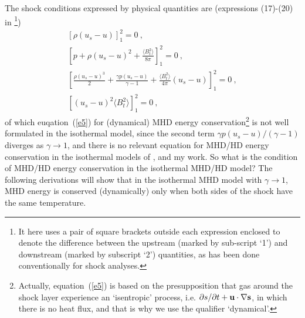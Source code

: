 \documentclass[fleqn,usenatbib]{mnras}
\begin{document}
The shock conditions expressed by physical quantities are (expressions (17)-(20) in \citet{wang2008dynamic}\footnote{It here uses a pair of square brackets outside each expression enclosed to denote the difference between the upstream (marked by sub-script `1') and downstream (marked by subscript `2') quantities, as has been done conventionally for shock analyses.})
\begin{gather}
\left[\rho\left(u_{s}-u\right)\right]_{1}^{2}=0\ ,\label{e3}\\
\left[p+\rho\left(u_{s}-u\right)^{2}+\frac{\langle B_{t}^{2}\rangle}{8\pi}\right]_{1}^{2}=0\ ,\label{e4}\\
\left[\frac{\rho\left(u_{s}-u\right)^{3}}{2}+\frac{\gamma p\left(u_{s}-u\right)}{\gamma-1}+\frac{\langle B_{t}^{2}\rangle}{4\pi}\left(u_{s}-u\right)\right]_{1}^{2}=0\ ,\label{e5}\\
\left[\left(u_{s}-u\right)^{2}\langle B_{t}^{2}\rangle\right]_{1}^{2}=0\ ,\label{e6}
\end{gather}
of which euqation~(\ref{e5}) for (dynamical) MHD energy conservation\footnote{Actually, equation~(\ref{e5}) is based on the presupposition that gas around the shock layer experience an `isentropic' process, i.e. $\partial s/\partial t+\bf{u}\cdot\nabla s$, in which there is no heat flux, and that is why we use the qualifier `dynamical'.} is not well formulated in the isothermal model, since the second term $\gamma p\left(u_{s}-u\right)/(\gamma-1)$ diverges as $\gamma\rightarrow 1$, and there is no relevant equation for MHD/HD energy conservation in the isothermal models of \citet{lou2014self}, \citet{yuLou2006} and my work. So what is the condition of MHD/HD energy conservation in the isothermal MHD/HD model? The following derivations will show that in the isothermal MHD model with $\gamma\rightarrow 1$, MHD energy is conserved (dynamically) only when both sides of the shock have the same temperature.
\end{document}
